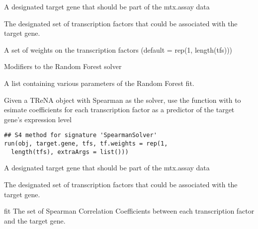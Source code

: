 \documentclass[a4paper]{book}
\begin{document}
%
\begin{Arguments}
\begin{ldescription}
\item[\code{target.gene}] A designated target gene that should be part of the mtx.assay data

\item[\code{tfs}] The designated set of transcription factors that could be associated with the target gene.

\item[\code{tf.weights}] A set of weights on the transcription factors (default = rep(1, length(tfs)))

\item[\code{extraArgs}] Modifiers to the Random Forest solver
\end{ldescription}
\end{Arguments}
%
\begin{Value}
A list containing various parameters of the Random Forest fit.
\end{Value}
%
\begin{Description}\relax
Given a TReNA object with Spearman as the solver, use the  function with
 to esimate coefficients for each transcription factor as a predictor of the target
gene's expression level
\end{Description}
%
\begin{Usage}
\begin{verbatim}
## S4 method for signature 'SpearmanSolver'
run(obj, target.gene, tfs, tf.weights = rep(1,
  length(tfs), extraArgs = list()))
\end{verbatim}
\end{Usage}
%
\begin{Arguments}
\begin{ldescription}
\item[\code{target.gene}] A designated target gene that should be part of the mtx.assay data

\item[\code{tfs}] The designated set of transcription factors that could be associated with the target gene.
\end{ldescription}
\end{Arguments}
%
\begin{Value}
fit The set of Spearman Correlation Coefficients between each transcription factor and the target gene.
\end{Value}
\end{document}
